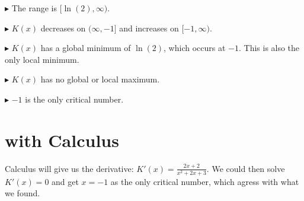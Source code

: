 \documentclass{ximera}
\begin{document}
$\blacktriangleright$  The range is $[\ln(2), \infty)$.

$\blacktriangleright$  $K(x)$ decreases on $(\infty, -1]$ and increases on $[-1, \infty)$.


$\blacktriangleright$  $K(x)$ has a global minimum of $\ln(2)$, which occurs at $-1$.  This is also the only local minimum.

$\blacktriangleright$  $K(x)$ has no global or local maximum.

$\blacktriangleright$  $-1$ is the only critical number.













\section{with Calculus}

Calculus will give us the derivative: $K'(x) = \frac{2x+2}{x^2+2x+3}$.  We could then solve $K'(x) = 0$ and get $x=-1$ as the only critical number, which agress with what we found.
\end{document}
